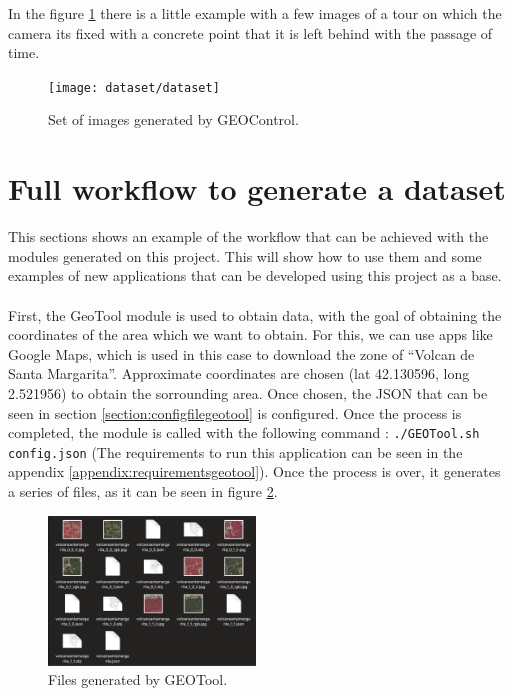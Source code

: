\documentclass[10pt,a4paper,twocolumn,twoside]{article}
\begin{document}
In the figure \ref{fig-dataset} there is a little example with a few images of a tour on which the camera its fixed with a concrete point that it is left behind with the passage of time.

\begin{figure}[!h]
\centering
  	\texttt{[image: dataset/dataset]}
	\caption{Set of images generated by GEOControl.}
	\label{fig-dataset}
\end{figure}

\section{Full workflow to generate a dataset}

This sections shows an example of the workflow that can be achieved with the modules generated on this project. This will show how to use them and some examples of new applications that can be developed using this project as a base.
\\
\\
First, the GeoTool module is used to obtain data, with the goal of obtaining the coordinates of the area which we want to obtain. For this, we can use apps like Google Maps, which is used in this case to download the zone of ``Volcan de Santa Margarita''. Approximate coordinates are chosen (lat 42.130596, long 2.521956) to obtain the sorrounding area. Once chosen, the JSON that can be seen in section \ref{section:configfilegeotool} is configured. Once the process is completed, the module is called with the following command : {\tt ./GEOTool.sh config.json} (The requirements to run this application can be seen in the appendix \ref{appendix:requirementsgeotool}). Once the process is over, it generates a series of files, as it can be seen in figure \ref{fig-filesgeotool}.

\begin{figure}[!h]
\centering
  	\includegraphics[width=0.49\textwidth]{filesgeotool}
	\caption{Files generated by GEOTool.}
	\label{fig-filesgeotool}
\end{figure}
\end{document}
